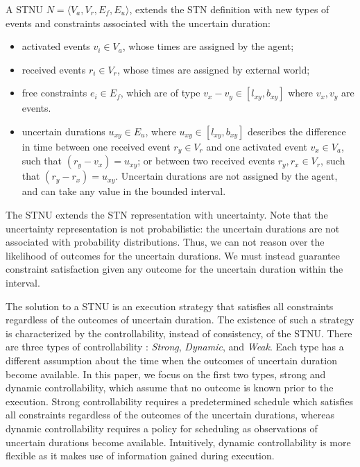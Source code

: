 \documentclass[jair,twoside,11pt,theapa]{article}
\begin{document}
\begin{mydef}
	A STNU $N = \langle V_a, V_r, E_f, E_u\rangle$, extends the STN definition with new types of events and constraints
associated with the uncertain duration:
	
	\begin{itemize}
		\item activated events $v_i \in V_a$, whose times are assigned by the agent;
		\item received events $r_i \in V_r$, whose times are assigned by external
world;
		\item free constraints $e_i \in E_f$, which are of type $v_x - v_y \in
[l_{xy},b_{xy}]$ where $v_x, v_y$ are events. 
		\item uncertain durations $u_{xy} \in E_u$, where $u_{xy} \in [l_{xy},b_{xy}]$ describes the difference in time
		 between one received event $r_y\in V_r$ and one activated event $v_x\in V_a$, such that $(r_y - v_x) = u_{xy}$; or between two received events $r_y, r_x\in V_r$, such that $(r_y - r_x) = u_{xy}$. 
		 Uncertain durations are not assigned by the agent, and can take any value in the bounded interval. 
	\end{itemize}
	
\end{mydef}

The STNU extends the STN representation with uncertainty. Note that the uncertainty representation is not probabilistic: 
the uncertain durations are not associated with probability distributions. Thus, we can not reason over the likelihood of 
outcomes for the uncertain durations. We must instead guarantee constraint satisfaction given any outcome for the uncertain
duration within the interval. 

The solution to a STNU is an execution strategy that satisfies all constraints
regardless of the outcomes of uncertain duration. The existence of such a
strategy is characterized by the controllability, instead of consistency, of the
STNU. There are three types of controllability \cite{Vidal99handlingcontingency}: \textit{Strong},
\textit{Dynamic}, and \textit{Weak}. Each type has a different assumption about
the time when the outcomes of uncertain duration become available. In this
paper, we focus on the first two types, strong and dynamic controllability,
which assume that no outcome is known prior to the execution. Strong
controllability requires a predetermined schedule which satisfies all
constraints regardless of the outcomes of the uncertain durations, whereas
dynamic controllability requires a policy for scheduling as observations of
uncertain durations become available. Intuitively, dynamic controllability is
more flexible as it makes use of information gained during execution.
\end{document}
